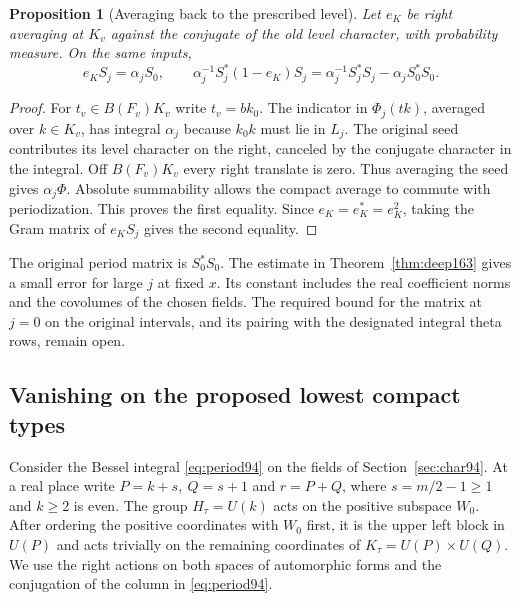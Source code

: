 \documentclass[a4paper,11pt]{article}
\newtheorem{proposition}{Proposition}[section]
\theoremstyle{definition}
\theoremstyle{remark}
\numberwithin{equation}{section}
\begin{document}
\begin{proposition}[Averaging back to the prescribed level]
\label{prop:average163}
Let \(e_K\) be right averaging at \(K_v\) against the conjugate
of the old level character, with probability measure. On the
same inputs,
\[
         e_K S_j=\alpha_j S_0,\qquad
         \alpha_j^{-1} S_j^*(1-e_K)S_j
              =\alpha_j^{-1}S_j^*S_j-\alpha_j S_0^*S_0 .
\]
\end{proposition}
\begin{proof}
For \(t_v\in B(F_v)K_v\) write \(t_v=bk_0\).
The indicator in \(\Phi_j(tk)\), averaged over \(k\in K_v\),
has integral \(\alpha_j\) because \(k_0 k\) must lie in
\(L_j\). The original seed contributes its level character on
the right, canceled by the conjugate character in the integral.
Off \(B(F_v)K_v\) every right translate is zero. Thus averaging
the seed gives \(\alpha_j\Phi\). Absolute summability allows
the compact average to commute with periodization. This proves
the first equality. Since \(e_K=e_K^*=e_K^2\), taking the
Gram matrix of \(e_K S_j\) gives the second equality.
\end{proof}

The original period matrix is \(S_0^*S_0\). The estimate
in Theorem~\ref{thm:deep163} gives a small error for large \(j\)
at fixed \(x\). Its constant includes the real coefficient
norms and the covolumes of the chosen fields. The required bound
for the matrix at \(j=0\) on the original intervals, and its
pairing with the designated integral theta rows, remain open.

\subsection{Vanishing on the proposed lowest compact types}\label{nav:VI-10}
\label{sec:branch106}

Consider the Bessel integral \eqref{eq:period94} on the fields of
Section~\ref{sec:char94}. At a real place write \(P=k+s,\ Q=s+1\)
and \(r=P+Q\), where \(s=m/2-1\ge1\) and \(k\ge2\) is even.
The group \(H_\tau=U(k)\) acts on the positive subspace \(W_0\).
After ordering the positive coordinates with \(W_0\) first, it
is the upper left block in \(U(P)\) and acts trivially on the
remaining coordinates of \(K_\tau=U(P)\times U(Q)\).
We use the right actions on both spaces of automorphic forms and
the conjugation of the column in \eqref{eq:period94}.
\end{document}
